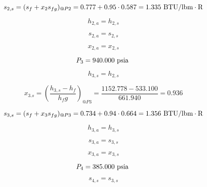 \documentclass{article}
\begin{document}
\begin{equation}
  s_{ 2,s} = (s_{f} + x_{ 2}s_{fg})_{@P 2} =    0.777 + 0.95\cdot   0.587 =    1.335
\textnormal{ BTU/lbm}\cdot\textnormal{R}
\end{equation}

\begin{equation}
h_{ 2,a} = h_{ 2,s}
\end{equation}

\begin{equation}
s_{ 2,a} = s_{ 2,s}
\end{equation}

\begin{equation}
x_{ 2,a} = x_{ 2,s}
\end{equation}

\begin{equation}
P_{ 3} =  940.000\textnormal{ psia                      }
\end{equation}

\begin{equation}
h_{ 3,s} = h_{ 2,s}
\end{equation}

\begin{equation}
x_{ 3.s} = (\frac{h_{ 3,s} - h_{f}}{h_fg})_{@P 3} = \frac{1152.778 -  533.100}{ 661.940} =    0.936
\end{equation}

\begin{equation}
  s_{ 3,s} = (s_{f} + x_{ 3}s_{fg})_{@P 3} =    0.734 + 0.94\cdot   0.664 =    1.356
\textnormal{ BTU/lbm}\cdot\textnormal{R}
\end{equation}

\begin{equation}
h_{ 3,a} = h_{ 3,s}
\end{equation}

\begin{equation}
s_{ 3,a} = s_{ 3,s}
\end{equation}

\begin{equation}
x_{ 3,a} = x_{ 3,s}
\end{equation}

\begin{equation}
P_{ 4} =  385.000\textnormal{ psia                      }
\end{equation}

\begin{equation}
s_{ 4,s} = s_{ 3,s}
\end{equation}
\end{document}
